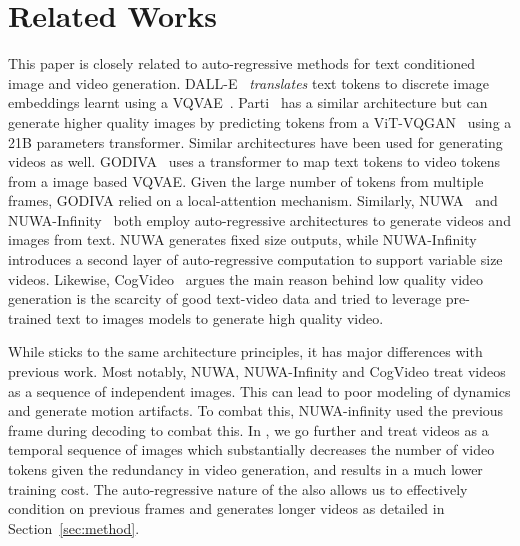 \section{Related Works}

This paper is closely related to auto-regressive methods for text conditioned image and video generation. DALL-E~\cite{DALLE} \textit{translates} text tokens to discrete image embeddings learnt using a VQVAE~\cite{vqvae}. Parti~\cite{PARTI} has a similar architecture but can generate higher quality images by predicting tokens from a ViT-VQGAN~\cite{vit_vqgan} using a 21B parameters transformer. Similar architectures have been used for generating videos as well. GODIVA~\cite{godiva} uses a transformer to map text tokens to video tokens from a image based VQVAE. Given the large number of tokens from multiple frames, GODIVA relied on a local-attention mechanism. Similarly, NUWA~\cite{nuwa} and NUWA-Infinity~\cite{wu2022nuwa} both employ auto-regressive architectures to generate videos and images from text. NUWA generates fixed size outputs, while NUWA-Infinity introduces a second layer of auto-regressive computation to support variable size videos. Likewise, CogVideo~\cite{cogvideo} argues the main reason behind low quality video generation is the scarcity of good text-video data and tried to leverage pre-trained text to images models to generate high quality video. 

While \model sticks to the same architecture principles, it has major differences with previous work. Most notably, NUWA, NUWA-Infinity and CogVideo treat videos as a sequence of independent images. This can lead to poor modeling of dynamics and generate motion artifacts. To combat this, NUWA-infinity used the previous frame during decoding to combat this. In \model, we go further and treat videos as a temporal sequence of images which substantially decreases the number of video tokens given the redundancy in video generation, and results in a much lower training cost. The auto-regressive nature of the \phenaki also allows us to effectively condition on previous frames and generates longer videos as detailed in Section~\ref{sec:method}.



